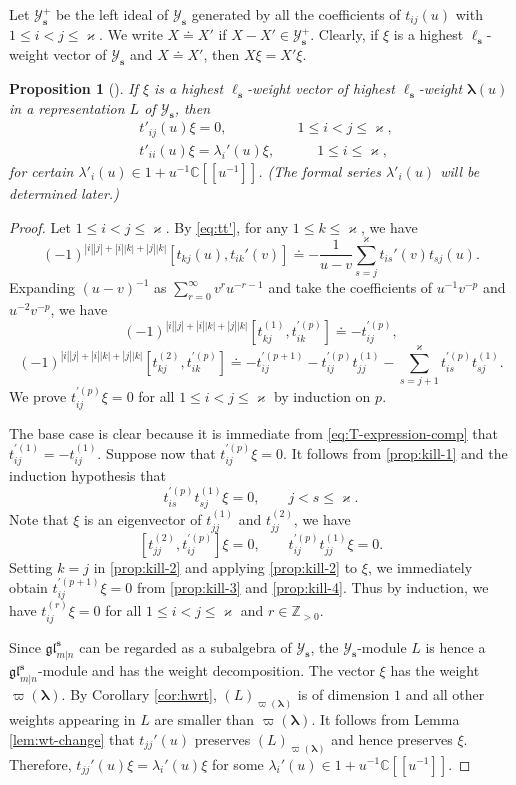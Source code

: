 \documentclass[11pt,reqno]{amsart}
\numberwithin{equation}{section}
\newtheorem{prop}[thm]{Proposition}
\theoremstyle{definition}
\theoremstyle{remark}
\newcommand{\beq}{\begin{equation}}
\newcommand{\eeq}{\end{equation}}
\newcommand{\C}{\mathbb{C}}
\newcommand{\Z}{\mathbb{Z}}
\newcommand{\lle}{\leqslant}
\newcommand{\la}{\lambda}
\newcommand{\bla}{\bm\lambda}
\newcommand{\glMN}{\mathfrak{gl}_{m|n}^{\bm s}}
\newcommand{\YMN}{{\mathscr{Y}_{\bm s}}}
\newcommand{\YMNp}{{\mathscr{Y}_{\bm s}^+}}
\newcommand{\ka}{\varkappa}
\newcommand{\s}{{\bm s}}
\begin{document}
Let $\YMNp$ be the left ideal of $\YMN$ generated by all the coefficients of $t_{ij}(u)$ with $1\lle i<j\lle \ka$. We write $X\doteq X'$ if $X-X'\in \YMNp$. Clearly, if $\xi$ is a highest $\ell_\s$-weight vector of $\YMN$ and $X\doteq X'$, then $X\xi=X'\xi$.

\begin{prop}[\cite{Ragoucy2007analytical,Belliard2009nested}]\label{prop:t'-l-weight}
If $\xi$ is a highest $\ell_\s$-weight vector of highest $\ell_\s$-weight $\bla(u)$ in a representation $L$ of $\YMN$, then
\beq\label{eq:t'-annih}
\begin{split}
   & t'_{ij}(u)\xi=0,  \qquad \quad\quad \quad 1\lle i<j\lle \ka,\\
   & t'_{ii}(u)\xi=\la_i'(u)\xi,\qquad\quad  1\lle i\lle \ka,
\end{split}
\eeq
for certain $\la'_i(u)\in 1+u^{-1}\C[[u^{-1}]]$. (The formal series $\la'_i(u)$ will be determined later.)
\end{prop}
\begin{proof}
Let $1\lle i<j\lle \ka$. By \eqref{eq:tt'}, for any $1\lle k\lle \ka$, we have
\[
(-1)^{|i||j|+|i||k|+|j||k|}[t_{kj}(u),t_{ik}'(v)]\doteq -\frac{1}{u-v}\sum_{s=j}^{\ka}t_{is}'(v)t_{sj}(u).
\]
Expanding $(u-v)^{-1}$ as $\sum_{r=0}^\infty v^ru^{-r-1}$ and take the coefficients of $u^{-1}v^{-p}$ and $u^{-2}v^{-p}$, we have
\beq\label{prop:kill-1}
(-1)^{|i||j|+|i||k|+|j||k|}[t_{kj}^{(1)},t_{ik}^{\prime (p)}]\doteq -t_{ij}^{\prime (p)},
\eeq
\beq\label{prop:kill-2}
(-1)^{|i||j|+|i||k|+|j||k|}[t_{kj}^{(2)},t_{ik}^{\prime (p)}]\doteq -t_{ij}^{\prime (p+1)}-t_{ij}^{\prime (p)}t_{jj}^{(1)}-\sum_{s=j+1}^\ka t_{is}^{\prime (p)}t_{sj}^{(1)}.
\eeq
We prove $t_{ij}^{\prime(p)}\xi=0$ for all $1\lle i<j\lle \ka$ by induction on $p$.

The base case is clear because it is immediate from \eqref{eq:T-expression-comp} that $t_{ij}^{\prime(1)}=-t_{ij}^{(1)}$. Suppose now that $t_{ij}^{\prime(p)}\xi=0$. It follows from \eqref{prop:kill-1} and the induction hypothesis that
\beq\label{prop:kill-3}
t_{is}^{\prime (p)}t_{sj}^{(1)}\xi=0,\qquad j<s\lle \ka.
\eeq
Note that $\xi$ is an eigenvector of $t_{jj}^{(1)}$ and $t_{jj}^{(2)}$, we have
\beq\label{prop:kill-4}
[t_{jj}^{(2)},t_{ij}^{\prime(p)}]\xi=0,\qquad  t_{ij}^{\prime (p)}t_{jj}^{(1)}\xi=0.
\eeq
Setting $k=j$ in \eqref{prop:kill-2} and applying \eqref{prop:kill-2} to $\xi$, we immediately obtain $t_{ij}^{\prime(p+1)}\xi=0$ from \eqref{prop:kill-3} and \eqref{prop:kill-4}. Thus by induction, we have $t_{ij}^{(r)}\xi=0$ for all $1\lle i<j\lle \ka$ and $r\in \Z_{>0}$.

Since $\glMN$ can be regarded as a subalgebra of $\YMN$, the $\YMN$-module $L$ is hence a $\glMN$-module and has the weight decomposition. The vector $\xi$ has the weight $\varpi(\bla)$. By Corollary \ref{cor:hwrt}, $(L)_{\varpi(\bla)}$ is of dimension $1$ and all other weights appearing in $L$ are smaller than $\varpi(\bla)$. It follows from Lemma \ref{lem:wt-change} that $t_{jj}'(u)$ preserves $(L)_{\varpi(\bla)}$ and hence preserves $\xi$. Therefore, $t_{jj}'(u)\xi=\la_i'(u)\xi$ for some $\la_i'(u)\in 1+u^{-1}\C[[u^{-1}]]$.
\end{proof}
\end{document}
